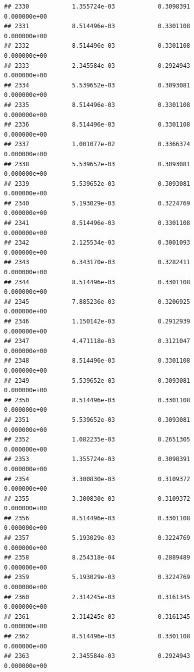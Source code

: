 \documentclass[
]{article}
\begin{document}
\begin{verbatim}
## 2330            1.355724e-03            0.3098391            0.000000e+00
## 2331            8.514496e-03            0.3301108            0.000000e+00
## 2332            8.514496e-03            0.3301108            0.000000e+00
## 2333            2.345584e-03            0.2924943            0.000000e+00
## 2334            5.539652e-03            0.3093081            0.000000e+00
## 2335            8.514496e-03            0.3301108            0.000000e+00
## 2336            8.514496e-03            0.3301108            0.000000e+00
## 2337            1.001077e-02            0.3366374            0.000000e+00
## 2338            5.539652e-03            0.3093081            0.000000e+00
## 2339            5.539652e-03            0.3093081            0.000000e+00
## 2340            5.193029e-03            0.3224769            0.000000e+00
## 2341            8.514496e-03            0.3301108            0.000000e+00
## 2342            2.125534e-03            0.3001093            0.000000e+00
## 2343            6.343170e-03            0.3282411            0.000000e+00
## 2344            8.514496e-03            0.3301108            0.000000e+00
## 2345            7.885236e-03            0.3206925            0.000000e+00
## 2346            1.150142e-03            0.2912939            0.000000e+00
## 2347            4.471118e-03            0.3121047            0.000000e+00
## 2348            8.514496e-03            0.3301108            0.000000e+00
## 2349            5.539652e-03            0.3093081            0.000000e+00
## 2350            8.514496e-03            0.3301108            0.000000e+00
## 2351            5.539652e-03            0.3093081            0.000000e+00
## 2352            1.082235e-03            0.2651305            0.000000e+00
## 2353            1.355724e-03            0.3098391            0.000000e+00
## 2354            3.300830e-03            0.3109372            0.000000e+00
## 2355            3.300830e-03            0.3109372            0.000000e+00
## 2356            8.514496e-03            0.3301108            0.000000e+00
## 2357            5.193029e-03            0.3224769            0.000000e+00
## 2358            8.254318e-04            0.2889489            0.000000e+00
## 2359            5.193029e-03            0.3224769            0.000000e+00
## 2360            2.314245e-03            0.3161345            0.000000e+00
## 2361            2.314245e-03            0.3161345            0.000000e+00
## 2362            8.514496e-03            0.3301108            0.000000e+00
## 2363            2.345584e-03            0.2924943            0.000000e+00

\end{verbatim}
\end{document}
